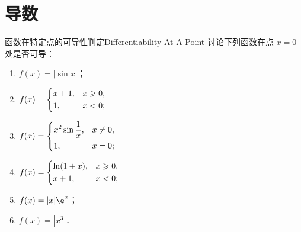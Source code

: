 \section{导数}

\begin{problem}{函数在特定点的可导性判定}{Differentiability-At-A-Point}
    讨论下列函数在点 $x = 0$ 处是否可导：
    \begin{enumerate}
        \item $f(x) = |\sin x|$；
        \item $f(x) = \begin{dcases} x + 1, & x \geqslant 0, \\ 1, & x < 0; \end{dcases}$
        \item $f(x) = \begin{dcases} x^2 \sin \frac{1}{x}, & x \neq 0, \\ 1, & x = 0; \end{dcases}$
        \item $f(x) = \begin{dcases} \ln(1 + x), & x \geqslant 0, \\ x + 1, & x < 0; \end{dcases}$
        \item $f(x) = |x|\e^x$；
        \item $f(x) = |x^3|$．
    \end{enumerate}
\end{problem}

